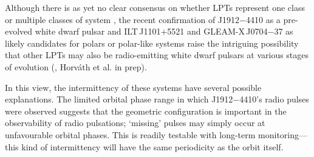 \documentclass[fleqn,usenatbib]{mnras}
\newcommand{\todo}[1]{{\color{red}#1}}
\begin{document}


Although there is as yet no clear consensus on whether LPTs represent one class or multiple classes of system \citep[e.g.][]{2024ApJ...961..214R}, the recent confirmation of J1912$-$4410 as a pre-evolved white dwarf pulsar \citep{2023NatAs...7..931P} and ILT\,J1101+5521 and GLEAM-X\,J0704$-$37 as likely candidates for polars or polar-like systems \citep{deRuiter2025,2025A&A...695L...8R} raise the intriguing possibility that other LPTs may also be radio-emitting white dwarf pulsars at various stages of evolution (\citealt{2021NatAs...5..648S}, Horv\'{a}th et al. in prep).

In this view, the intermittency of these systems have several possible explanations.
The limited orbital phase range in which J1912$-$4410's radio pulses were observed suggests that the geometric configuration is important in the observability of radio pulsations; `missing' pulses may simply occur at unfavourable orbital phases.
This is readily testable with long-term monitoring---this kind of intermittency will have the same periodicity as the orbit itself.
\end{document}

